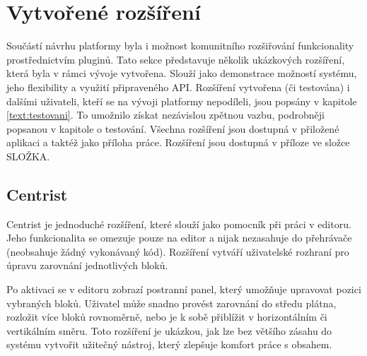


\section{Vytvořené rozšíření}\label{text:realizace/vytvoreneRozsireni}

Součástí návrhu platformy byla i možnost komunitního rozšiřování funkcionality prostřednictvím pluginů. 
Tato sekce představuje několik ukázkových rozšíření, která byla v rámci vývoje vytvořena. 
Slouží jako demonstrace možností systému, jeho flexibility a využití připraveného API. 
Rozšíření vytvořena (či testována) i dalšími uživateli, kteří se na vývoji platformy nepodíleli, jsou popsány v kapitole \ref{text:testovani}.
To umožnilo získat nezávislou zpětnou vazbu, podrobněji popsanou v kapitole o testování. Všechna rozšíření jsou dostupná v přiložené aplikaci a taktéž jako příloha práce.
Rozšíření jsou dostupná v příloze ve složce SLOŽKA.

\subsection{Centrist}

Centrist je jednoduché rozšíření, které slouží jako pomocník při práci v editoru.
Jeho funkcionalita se omezuje pouze na editor a nijak nezasahuje do přehrávače (neobsahuje žádný vykonávaný kód).
Rozšíření vytváří uživatelské rozhraní pro úpravu zarovnání jednotlivých bloků.

Po aktivaci se v editoru zobrazí postranní panel, který umožňuje upravovat pozici vybraných bloků. 
Uživatel může snadno provést zarovnání do středu plátna, rozložit více bloků rovnoměrně, nebo je k sobě přiblížit v horizontálním či vertikálním směru. 
Toto rozšíření je ukázkou, jak lze bez většího zásahu do systému vytvořit užitečný nástroj, který zlepšuje komfort práce s obsahem.

